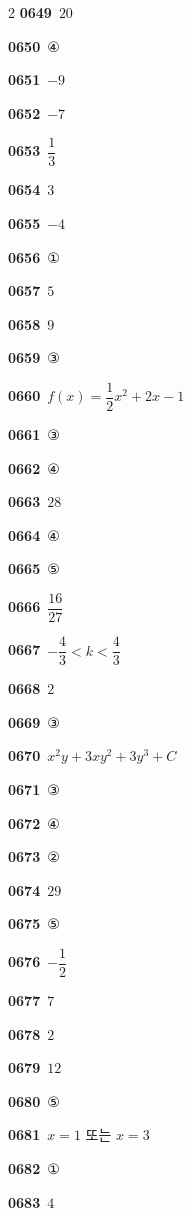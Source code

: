 \documentclass[10pt,a4paper]{article}
\begin{document}
\begin{multicols}{2}
\noindent\textbf{0649}\ $20$\par
\noindent\textbf{0650}\ ④\par
\noindent\textbf{0651}\ $-9$\par
\noindent\textbf{0652}\ $-7$\par
\noindent\textbf{0653}\ $\dfrac{1}{3}$\par
\noindent\textbf{0654}\ $3$\par
\noindent\textbf{0655}\ $-4$\par
\noindent\textbf{0656}\ ①\par
\noindent\textbf{0657}\ $5$\par
\noindent\textbf{0658}\ $9$\par
\noindent\textbf{0659}\ ③\par
\noindent\textbf{0660}\ $f(x)=\dfrac{1}{2}x^2+2x-1$\par
\noindent\textbf{0661}\ ③\par
\noindent\textbf{0662}\ ④\par
\noindent\textbf{0663}\ $28$\par
\noindent\textbf{0664}\ ④\par
\noindent\textbf{0665}\ ⑤\par
\noindent\textbf{0666}\ $\dfrac{16}{27}$\par
\noindent\textbf{0667}\ $-\dfrac{4}{3}<k<\dfrac{4}{3}$\par
\noindent\textbf{0668}\ $2$\par
\noindent\textbf{0669}\ ③\par
\noindent\textbf{0670}\ $x^2y+3xy^2+3y^3+C$\par
\noindent\textbf{0671}\ ③\par
\noindent\textbf{0672}\ ④\par
\noindent\textbf{0673}\ ②\par
\noindent\textbf{0674}\ $29$\par
\noindent\textbf{0675}\ ⑤\par
\noindent\textbf{0676}\ $-\dfrac{1}{2}$\par
\noindent\textbf{0677}\ $7$\par
\noindent\textbf{0678}\ $2$\par
\noindent\textbf{0679}\ $12$\par
\noindent\textbf{0680}\ ⑤\par
\noindent\textbf{0681}\ $x=1$ 또는 $x=3$\par
\noindent\textbf{0682}\ ①\par
\noindent\textbf{0683}\ $4$\par

\end{multicols}
\end{document}
